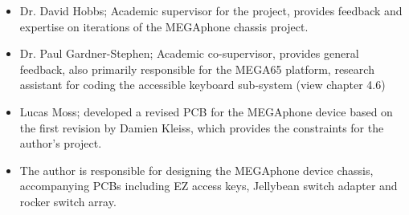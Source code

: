 \begin{itemize} 
    \item Dr. David Hobbs; Academic supervisor for the project, provides feedback and expertise on iterations of the MEGAphone chassis project.
    \item Dr. Paul Gardner-Stephen; Academic co-supervisor, provides general feedback, also primarily responsible for the MEGA65 platform, research assistant for coding the accessible keyboard sub-system (view chapter 4.6)
    \item Lucas Moss; developed a revised PCB for the MEGAphone device based on the first revision by Damien Kleiss, which provides the constraints for the author's project.
    \item The author is responsible for designing the MEGAphone device chassis, accompanying PCBs including EZ access keys, Jellybean switch adapter and rocker switch array.
    \end{itemize}